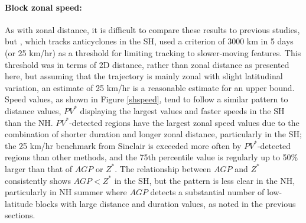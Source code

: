 \documentclass[smallextended]{svjour3}       %
\numberwithin{equation}{section}
\begin{document}

\paragraph{Block zonal speed:} As with zonal distance, it is difficult to compare these results to previous studies, but \cite{sinclair_climatology_1996}, which tracks anticyclones in the SH, used a criterion of 3000 km in 5 days (or 25 km/hr) as a threshold for limiting tracking to slower-moving features. This threshold was in terms of 2D distance, rather than zonal distance as presented here, but assuming that the trajectory is mainly zonal with slight latitudinal variation, an estimate of 25 km/hr is a reasonable estimate for an upper bound. 
{\color{blue}
Speed values, as shown in Figure \ref{shspeed}, tend to follow a similar pattern to distance values, $PV^*$ displaying the largest values and faster speeds in the SH than the NH.  $PV^*$-detected regions have the largest zonal speed values due to the combination of shorter duration and longer zonal distance, particularly in the SH; the 25 km/hr benchmark from Sinclair is exceeded more often by $PV^*$-detected regions than other methods, and the 75th percentile value is regularly up to 50\% larger than that of $AGP$ or $Z^*$. The relationship between $AGP$ and $Z^*$ consistently shows $AGP<Z^*$ in the SH, but the pattern is less clear in the NH, particularly in NH summer where $AGP$ detects a substantial number of low-latitude blocks with large distance and duration values, as noted in the previous sections.}
\end{document}
